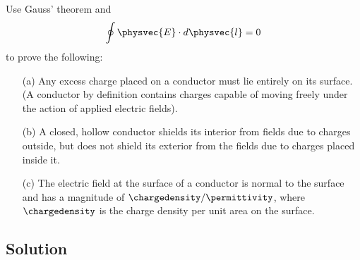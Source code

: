 Use Gauss' theorem and
\[
\oint \physvec{E}\cdot d\physvec{l} = 0
\]
to prove the following:
\begin{itemize}
\item[(a)] Any excess charge placed on a conductor must lie entirely
  on its surface.  (A conductor by definition contains charges
  capable of moving freely under the action of applied electric
  fields).
\item[(b)] A closed, hollow conductor shields its interior from
  fields due to charges outside, but does not shield its exterior
  from the fields due to charges placed inside it.
\item [(c)] The electric field at the surface of a conductor is
  normal to the surface and has a magnitude of
  $\chargedensity/\permittivity$, where $\chargedensity$ is the
  charge density per unit area on the surface.
\end{itemize}

\subsection*{Solution}

